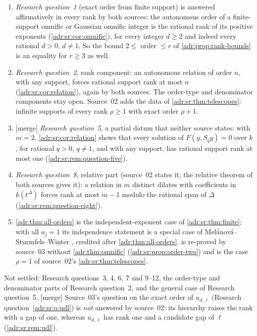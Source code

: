 \documentclass[11pt,letterpaper]{article}
\numberwithin{equation}{section}
\theoremstyle{definition}
\theoremstyle{remark}
\newcommand{\mtag}{\textup{[merge]}}%
\begin{document}
\begin{enumerate}[leftmargin=*,itemsep=3pt]
\item \emph{Research question~1} (exact order from finite support) is
answered affirmatively in every rank by both sources: the autonomous order of
a finite-support omnific or Gaussian omnific integer is the rational rank of
its positive exponents (\cref{adr:sr:cor:omnific}), for every integer $d\ge2$
and indeed every rational $d>0$, $d\ne1$. So the bound $2\le$ order $\le r$ of
\cref{adr:prop:rank-bounds} is an equality for $r\ge3$ as well.
\item \emph{Research question~2}, rank component: an autonomous relation of
order $n$, with any support, forces rational support rank at most $n$
(\cref{adr:sr:cor:relation}), again by both sources. The order-type and
denominator components stay open. Source~02 adds the data of
\cref{adr:sr:thm:telescopes}: infinite supports of every rank $\rho\ge1$ with
exact order $\rho+1$.
\item \mtag{} \emph{Research question~5}, a partial datum that neither source
states: with $m=2$, \cref{adr:sr:cor:relation} shows that every solution of
$F(y,S_qy)=0$ over $k$, for rational $q>0$, $q\ne1$, and with any support, has
rational support rank at most one (\cref{adr:sr:rem:question-five}).
\item \emph{Research question~8}, relative part (source~02 states it; the
relative theorem of both sources gives it): a relation in $m$ distinct
dilates with coefficients in $k(t^{\Delta})$ forces rank at most $m-1$
modulo the rational span of $\Delta$ (\cref{adr:sr:rem:question-eight}).
\item \cref{adr:thm:all-orders} is the independent-exponent case of
\cref{adr:sr:thm:finite}; with all $a_j=1$ its independence statement is a
special case of Mel\'anov\'a--Sturmfels--Winter \cite[Proposition~3]{MSW},
credited after \cref{adr:thm:all-orders}.  is
re-proved by source~03 without \cref{adr:thm:omnific}
(\cref{adr:sr:prop:order-two}) and is the case $\rho=1$ of source~02's
\cref{adr:sr:thm:telescopes}.
\end{enumerate}
Not settled: Research questions~3, 4, 6, 7 and 9--12, the order-type and
denominator parts of Research question~2, and the general case of Research
question~5. \mtag{} Source~03's question on the exact order of $u_{d,\ell}$
(Research question~\ref{adr:sr:q:udl}) is \emph{not} answered by source~02:
its hierarchy raises the rank with a gap of one, whereas $u_{d,\ell}$ has rank
one and a candidate gap of $\ell$ (\cref{adr:sr:rem:udl}).
\end{document}
